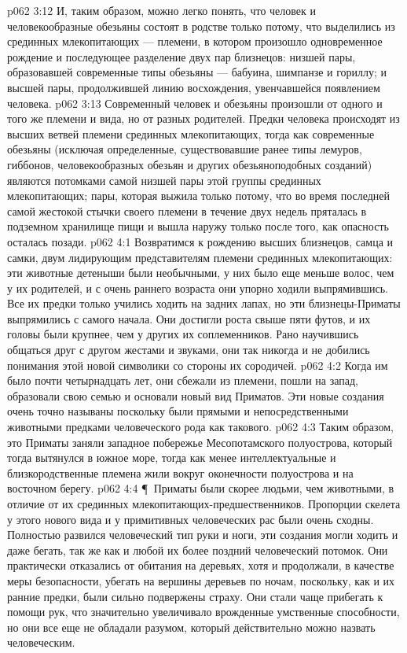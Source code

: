 \vs p062 3:12 И, таким образом, можно легко понять, что человек и человекообразные обезьяны состоят в родстве только потому, что выделились из срединных млекопитающих --- племени, в котором произошло одновременное рождение и последующее разделение двух пар близнецов: низшей пары, образовавшей современные типы обезьяны --- бабуина, шимпанзе и гориллу; и высшей пары, продолжившей линию восхождения, увенчавшейся появлением человека.
\vs p062 3:13 Современный человек и обезьяны произошли от одного и того же племени и вида, но от разных родителей. Предки человека происходят из высших ветвей племени срединных млекопитающих, тогда как современные обезьяны (исключая определенные, существовавшие ранее типы лемуров, гиббонов, человекообразных обезьян и других обезьяноподобных созданий) являются потомками самой низшей пары этой группы срединных млекопитающих; пары, которая выжила только потому, что во время последней самой жестокой стычки своего племени в течение двух недель пряталась в подземном хранилище пищи и вышла наружу только после того, как опасность осталась позади.
\vs p062 4:1 Возвратимся к рождению высших близнецов, самца и самки, двум лидирующим представителям племени срединных млекопитающих: эти животные детеныши были необычными, у них было еще меньше волос, чем у их родителей, и с очень раннего возраста они упорно ходили выпрямившись. Все их предки только учились ходить на задних лапах, но эти близнецы\hyp{}Приматы выпрямились с самого начала. Они достигли роста свыше пяти футов, и их головы были крупнее, чем у других их соплеменников. Рано научившись общаться друг с другом жестами и звуками, они так никогда и не добились понимания этой новой символики со стороны их сородичей.
\vs p062 4:2 Когда им было почти четырнадцать лет, они сбежали из племени, пошли на запад, образовали свою семью и основали новый вид Приматов. Эти новые создания очень точно называны  поскольку были прямыми и непосредственными животными предками человеческого рода как такового.
\vs p062 4:3 Таким образом, это Приматы заняли западное побережье Месопотамского полуострова, который тогда вытянулся в южное море, тогда как менее интеллектуальные и близкородственные племена жили вокруг оконечности полуострова и на восточном берегу.
\vs p062 4:4 \P\ Приматы были скорее людьми, чем животными, в отличие от их срединных млекопитающих\hyp{}предшественников. Пропорции скелета у этого нового вида и у примитивных человеческих рас были очень сходны. Полностью развился человеческий тип руки и ноги, эти создания могли ходить и даже бегать, так же как и любой их более поздний человеческий потомок. Они практически отказались от обитания на деревьях, хотя и продолжали, в качестве меры безопасности, убегать на вершины деревьев по ночам, поскольку, как и их ранние предки, были сильно подвержены страху. Они стали чаще прибегать к помощи рук, что значительно увеличивало врожденные умственные способности, но они все еще не обладали разумом, который действительно можно назвать человеческим.
